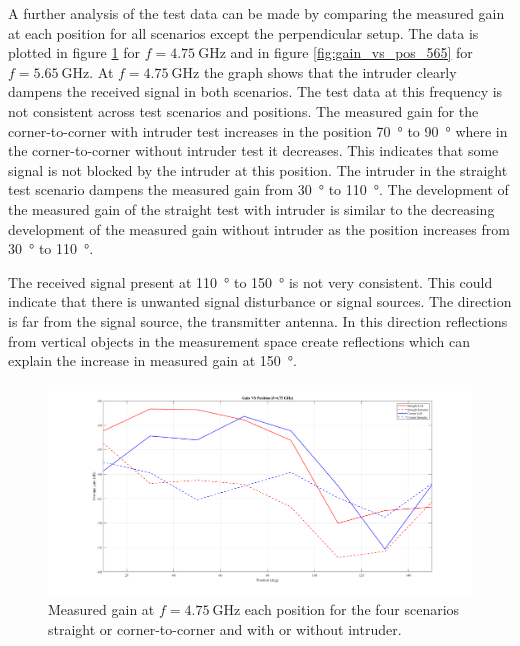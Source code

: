 A further analysis of the test data can be made by comparing the measured gain at each position for all scenarios except the perpendicular setup. The data is plotted in figure \ref{fig:gain_vs_pos_475} for $f=\SI{4.75}{\giga\hertz}$ and in figure \ref{fig:gain_vs_pos_565} for $f=\SI{5.65}{\giga\hertz}$. At $f=\SI{4.75}{\giga\hertz}$ the graph shows that the intruder clearly dampens the received signal in both scenarios. The test data at this frequency is not consistent across test scenarios and positions. The measured gain for the corner-to-corner with intruder test increases in the position \SI{70}{\degree} to \SI{90}{\degree} where in the corner-to-corner without intruder test it decreases. This indicates that some signal is not blocked by the intruder at this position. The intruder in the straight test scenario dampens the measured gain from \SI{30}{\degree} to \SI{110}{\degree}. The development of the measured gain of the straight test with intruder is similar to the decreasing development of the measured gain without intruder as the position increases from \SI{30}{\degree} to \SI{110}{\degree}. 

The received signal present at \SI{110}{\degree} to \SI{150}{\degree} is not very consistent. This could indicate that there is unwanted signal disturbance or signal sources. The direction is far from the signal source, the transmitter antenna. In this direction reflections from vertical objects in the measurement space create reflections which can explain the increase in measured gain at \SI{150}{\degree}.

\begin{figure}[H]
    \centering
    \includegraphics[width=1\textwidth]{figures/gain_vs_pos_475.png}
    \caption{Measured gain at $f=\SI{4.75}{\giga\hertz}$ each position for the four scenarios straight or corner-to-corner and with or without intruder.} 
    \label{fig:gain_vs_pos_475}
\end{figure}

